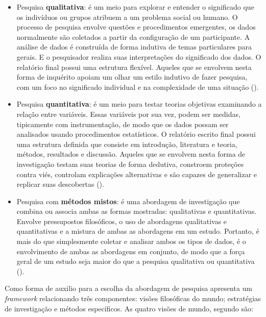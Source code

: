 \begin{itemize}
    \item Pesquisa \textbf{qualitativa}: é um meio para explorar e entender o significado que os indivíduos ou grupos atribuem a um problema social ou humano. O processo de pesquisa envolve questões e procedimentos emergentes, os dados normalmente são coletados a partir da configuração de um participante. A análise de dados é construída de forma indutiva de temas particulares para gerais. E o pesquisador realiza suas interpretações do significado dos dados. O relatório final possui uma estrutura flexível. Aqueles que se envolvem nesta forma de inquérito apoiam um olhar um estilo indutivo de fazer pesquisa, com um foco no significado individual e na complexidade de uma situação (\cite{creswell_research_2014}).
    
    \item Pesquisa \textbf{quantitativa}: é um meio para testar teorias objetivas examinando a relação entre variáveis. Essas variáveis por sua vez, podem ser medidas, tipicamente com instrumentação, de modo que os dados possam ser analisados usando procedimentos estatísticos. O relatório escrito final possui uma estrutura definida que consiste em introdução, literatura e teoria, métodos, resultados e discussão. Aqueles que se envolvem nesta forma de investigação testam suas teorias de forma dedutiva, constroem proteções contra viés, controlam explicações alternativas e são capazes de generalizar e replicar suas descobertas (\cite{creswell_research_2014}).
    
    \item Pesquisa com \textbf{métodos mistos}: é uma abordagem de investigação que combina ou associa ambas as formas mostradas: qualitativas e quantitativas. Envolve pressupostos filosóficos, o uso de abordagens qualitativas e quantitativas e a mistura de ambas as abordagens em um estudo. Portanto, é mais do que simplesmente coletar e analisar ambos os tipos de dados, é o envolvimento de ambas as abordagens em conjunto, de modo que a força geral de um estudo seja maior do que a pesquisa qualitativa ou quantitativa (\cite{creswell_research_2014}).
\end{itemize}

Como forma de auxilio para a escolha da abordagem de pesquisa \cite{creswell_research_2014} apresenta um \emph{framework} relacionando três componentes: visões filosóficas do mundo; estratégias de investigação e métodos específicos. As quatro visões de mundo, segundo \cite{creswell_research_2014} são:

